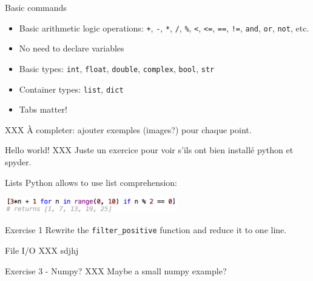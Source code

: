 \documentclass{beamer}
\begin{document}
	\begin{frame}{Basic commands}
		\begin{itemize}
			\item Basic arithmetic logic operations: \texttt{+}, \texttt{-}, \texttt{*}, \texttt{/}, \texttt{\%}, \texttt{<}, \texttt{<=}, \texttt{==}, \texttt{!=}, \texttt{and}, \texttt{or}, \texttt{not}, etc.
			\item No need to declare variables
			\item Basic types: \texttt{int}, \texttt{float}, \texttt{double}, \texttt{complex}, \texttt{bool}, \texttt{str}
			\item Container types: \texttt{list}, \texttt{dict}
			\item Tabs matter!
		\end{itemize}
	
		XXX À completer: ajouter exemples (images?) pour chaque point.
		
	\end{frame}

	\begin{frame}{Hello world!}
		XXX Juste un exercice pour voir s'ils ont bien installé python et spyder.
	\end{frame}

	\begin{frame}{Lists}
		Python allows to use list comprehension:
		
		\includegraphics[height=20pt]{img/lists.png}
		
		\vspace{20pt}
		
		\begin{block}{Exercise 1}
			Rewrite the \texttt{filter\_positive} function and reduce it to one line.
		\end{block}
	\end{frame}

	\begin{frame}{File I/O}
		XXX sdjhj
	\end{frame}

	\begin{frame}{Exercise 3 - Numpy?}
		XXX Maybe a small numpy example?
	\end{frame}
\end{document}
